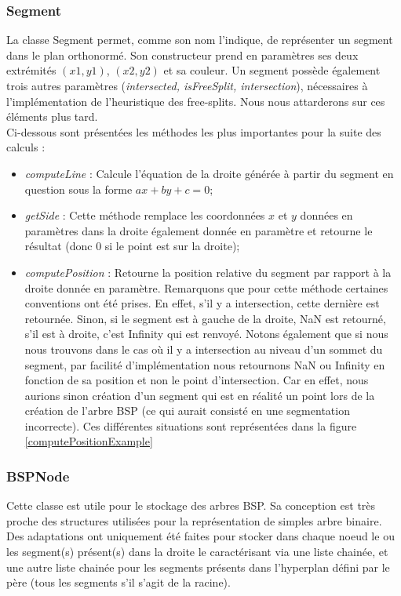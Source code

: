 \documentclass[11pt,a4paper]{article}
\begin{document}
\subsubsection{Segment}
La classe Segment permet, comme son nom l'indique, de représenter un segment dans le plan orthonormé. Son constructeur prend en paramètres ses deux extrémités $(x1,y1)$, $(x2,y2)$ et sa couleur. Un segment possède également trois autres paramètres (\emph{intersected, isFreeSplit, intersection}), nécessaires à l'implémentation de l'heuristique des free-splits. Nous nous attarderons sur ces éléments plus tard. \\
Ci-dessous sont présentées les méthodes les plus importantes pour la suite des calculs :
\begin{itemize}
\item \emph{computeLine} : Calcule l'équation de la droite générée à partir du segment en question sous la forme $ax + by + c = 0$;
\item \emph{getSide} : Cette méthode remplace les coordonnées $x$ et $y$ données en paramètres dans la droite également donnée en paramètre et retourne le résultat (donc 0 si le point est sur la droite);
\item \emph{computePosition} : Retourne la position relative du segment par rapport à la droite donnée en paramètre. Remarquons que pour cette méthode certaines conventions ont été prises. En effet, s'il y a intersection, cette dernière est retournée. Sinon, si le segment est à gauche de la droite, NaN est retourné, s'il est à droite, c'est Infinity qui est renvoyé. Notons également que si nous nous trouvons dans le cas où il y a intersection au niveau d'un sommet du segment, par facilité d'implémentation nous retournons NaN ou Infinity en fonction de sa position et non le point d'intersection. Car en effet, nous aurions sinon création d'un segment qui est en réalité un point lors de la création de l'arbre BSP (ce qui aurait consisté en une segmentation incorrecte). Ces différentes situations sont représentées dans la figure \ref{computePositionExample}
\end{itemize}

\subsubsection{BSPNode} 
Cette classe est utile pour le stockage des arbres BSP. Sa conception est très proche des structures utilisées pour la représentation de simples arbre binaire. Des adaptations ont uniquement été faites pour stocker dans chaque noeud le ou les segment(s) présent(s) dans la droite le caractérisant via une liste chainée, et une autre liste chainée pour les segments présents dans l'hyperplan défini par le père (tous les segments s'il s'agit de la racine). 
\end{document}
